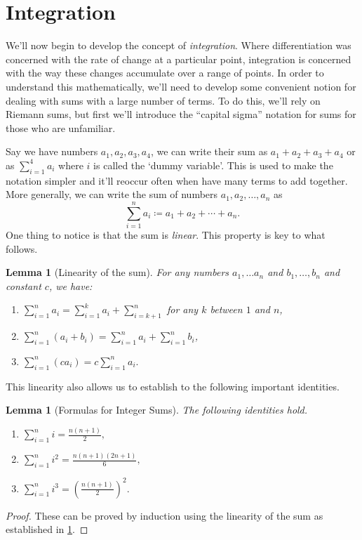 \documentclass[12pt]{article}
\newtheorem{lem}[thm]{Lemma}
\theoremstyle{definition}
\theoremstyle{plain}
\numberwithin{equation}{section}
\begin{document}
\section{Integration}

We'll now begin to develop the concept of \emph{integration}. Where differentiation was concerned with the rate of change at a particular point, integration is concerned with the way these changes accumulate over a range of points. In order to understand this mathematically, we'll need to develop some convenient notion for dealing with sums with a large number of terms. To do this, we'll rely on Riemann sums, but first we'll introduce the ``capital sigma'' notation for sums for those who are unfamiliar.


Say we have numbers $a_1, a_2, a_3, a_4$, we can write their sum as $a_1+a_2+a_3+a_4$ or as $\sum_{i=1}^4a_i$ where $i$ is called the `dummy variable'. This is used to make the notation simpler and it'll reoccur often when have many terms to add together. More generally, we can write the sum of numbers $a_1, a_2,\dotsc, a_n$ as
\begin{equation}
\sum_{i=1}^{n}a_i \coloneqq a_1+a_2+\dotsb+a_n.
\end{equation}
One thing to notice is that the sum is \emph{linear}. This property is key to what follows.

\begin{lem}[Linearity of the sum]\label{LinSum}
  For any numbers $a_1, \dotsc a_n$ and $b_1, \dotsc, b_n$ and constant $c$, we have:
  \begin{enumerate}
    \item $\sum_{i=1}^{n}a_i=\sum_{i=1}^{k}a_i+\sum_{i=k+1}^{n}$ for any $k$ between $1$ and $n$,
    \item $\sum_{i=1}^{n}(a_i+b_i)=\sum_{i=1}^{n}a_i+\sum_{i=1}^{n}b_i$,
    \item $\sum_{i=1}^{n}(ca_i)=c\sum_{i=1}^{n}a_i.$
  \end{enumerate}
\end{lem}


This linearity also allows us to establish to the following important identities.

\begin{lem}[Formulas for Integer Sums]\label{IntegerSums}
  The following identities hold.
\begin{enumerate}
  \item $\sum_{i=1}^{n}i=\frac{n(n+1)}{2},$
  \item $\sum_{i=1}^{n}i^2=\frac{n(n+1)(2n+1)}{6},$
  \item $\sum_{i=1}^{n}i^3=\left(\frac{n(n+1)}{2} \right)^2.$
\end{enumerate}
\end{lem}
\begin{proof}
  These can be proved by induction using the linearity of the sum as established in \cref{LinSum}.
\end{proof}
\end{document}
